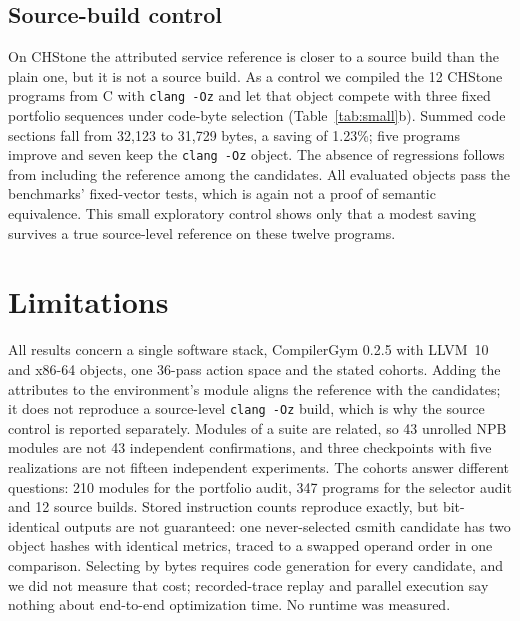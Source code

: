 \documentclass[conference,a4paper]{IEEEtran}
\begin{document}
\subsection{Source-build control}
On CHStone the attributed service reference is closer to a source build
than the plain one, but it is not a source build. As a control we
compiled the 12 CHStone programs from C with \texttt{clang -Oz} and let that object
compete with three fixed portfolio sequences under code-byte selection
(Table~\ref{tab:small}b). Summed code sections fall from 32,123 to
31,729 bytes, a saving of 1.23\%; five programs improve and seven keep
the \texttt{clang -Oz} object. The absence of regressions follows from
including the reference among the candidates. All evaluated objects
pass the benchmarks' fixed-vector tests, which is again not a proof of
semantic equivalence. This small exploratory control shows only that a
modest saving survives a true source-level reference on these twelve
programs.

\section{Limitations}
All results concern a single software stack, CompilerGym 0.2.5 with
LLVM~10 and x86-64 objects, one 36-pass action space and the stated
cohorts. Adding the
attributes to the environment's module aligns the reference with the
candidates; it does not reproduce a source-level \texttt{clang -Oz}
build, which is why the source control is reported separately. Modules of
a suite are related, so 43 unrolled NPB modules are not 43 independent
confirmations, and three checkpoints with five realizations are not
fifteen independent experiments. The cohorts answer different
questions: 210 modules for the portfolio audit, 347 programs for the
selector audit and 12 source builds. Stored instruction counts
reproduce exactly, but bit-identical outputs are not guaranteed: one
never-selected csmith candidate has two object hashes with identical
metrics, traced to a swapped operand order in one comparison. Selecting
by bytes requires code generation for every candidate, and we did not
measure that cost; recorded-trace replay and parallel execution say
nothing about end-to-end optimization time. No runtime was measured.
\end{document}
